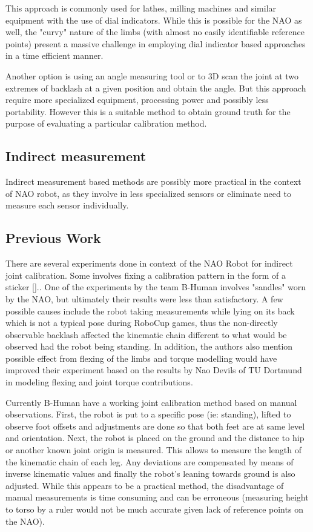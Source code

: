 \documentclass[english, printversion, nomenclature, notitle]{tuvisionthesis} %
\begin{document}
This approach is commonly used for lathes, milling machines and similar equipment with the use of dial indicators. While this is possible for the NAO as well, the "curvy" nature of the limbs (with almost no easily identifiable reference points) present a massive challenge in employing dial indicator based approaches in a time efficient manner.

Another option is using an angle measuring tool or to 3D scan the joint at  two extremes of backlash at a given position and obtain the angle. But this approach require more specialized equipment, processing power and possibly less portability. However this is a suitable method to obtain ground truth for the purpose of evaluating a particular calibration method. 

\subsection{Indirect measurement}
Indirect measurement based methods are possibly more practical in the context of NAO robot, as they involve in less specialized sensors or eliminate need to measure each sensor individually.
\subsection{Previous Work}

There are several experiments done in context of the NAO Robot for indirect joint calibration. Some involves fixing a calibration pattern in the form of a sticker [].. One of the experiments by the team B-Human involves "sandles" worn by the NAO, but ultimately their results were less than satisfactory. A few possible causes include the robot taking measurements while lying on its back which is not a typical pose during RoboCup games, thus the non-directly observable backlash affected the kinematic chain different to what would be observed had the robot being standing.  In addition, the authors also mention possible effect from flexing of the limbs and torque modelling would have improved their experiment based on the results by Nao Devils of TU Dortmund in modeling flexing and joint torque contributions. 

Currently B-Human have a working joint calibration method based on manual observations. First, the robot is put to a specific pose (ie: standing), lifted to observe foot offsets and adjustments are done so that both feet are at same level and orientation. Next, the robot is placed on the ground and the distance to hip or another known joint origin is measured. This allows to measure the length of the kinematic chain of each leg. Any deviations are compensated by means of inverse kinematic values and finally the robot's leaning  towards ground is also adjusted. While this appears to be a practical method, the disadvantage of manual measurements is time consuming and can be erroneous (measuring height to torso by a ruler would not be much accurate given lack of reference points on the NAO).
\end{document}

